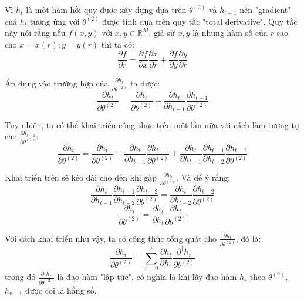 Vì $h_t$ là một hàm hồi quy được xây dựng dựa trên $\theta^{(2)}$ và $h_{t-1}$ nên "gradient" cuả $h_t$ tương ứng với $\theta^{(2)}$ được tính dựa trên quy tắc "total derivative". Quy tắc này nói rằng nếu $f(x,y)$ với $x, y \in \mathbb{R}^M$, giả sử $x,y$ là những hàm số của $r$ sao cho $x = x(r); y = y(r)$ thì ta có:
\begin{equation} \label{gradientWRTSt6}
	\frac{\partial{f}}{\partial{r}} = \frac{\partial f}{\partial x}\frac{\partial x }{\partial r} + \frac{\partial f }{\partial y }\frac{\partial y }{\partial r }
\end{equation}

Áp dụng vào trường hợp của $\frac{\partial h_t}{\partial \theta^{(2)} }$ ta được:
\begin{equation} \label{gradientWRTSt7}
	\frac{\partial h_t}{ \partial \theta^{(2)}} = \frac{\partial h_t}{ \partial \theta^{(2)}} + \frac{\partial h_t }{\partial h_{t-1} } \frac{\partial h_{t-1}}{ \partial \theta^{(2)}}
\end{equation}

Tuy nhiên, ta có thể khai triển công thức trên một lần nữa với cách làm tương tự cho $\frac{\partial h_{t-1}}{\partial \theta^{(2)} }$:
\begin{equation} \label{gradientWRTSt8}
	\frac{\partial h_t}{\partial \theta^{(2)}} = \frac{\partial h_t}{\partial \theta^{(2)}} + \frac{\partial h_t }{\partial h_{t-1}} \frac{\partial h_{t-1}}{\partial \theta^{(2)}} + \frac{\partial h_t}{\partial h_{t-1}} \frac{\partial h_{t-1}}{\partial h_{t-2}} \frac{\partial h_{t-2}}{\partial \theta^{(2)}}
\end{equation}

Khai triển trên sẽ kéo dài cho đến khi gặp $\frac{\partial h_0}{\partial \theta^{(2)}}$. Và để ý rằng:
\begin{equation} \label{gradientWRTSt9}
	\frac{\partial h_t}{\partial h_{t-1}} \frac{\partial h_{t-1}}{\partial h_{t-2}} \frac{\partial h_{t-2}}{\partial \theta^{(2)}} = \frac{\partial h_t}{\partial h_{t-2}}\frac{\partial h_{t-2}}{\partial \theta^{(2)}}
\end{equation}
\begin{equation} \label{gradientWRTSt10}
	\frac{\partial h_{t}}{\partial \theta^{(2)}} = \frac{\partial h_{t}}{\partial h_t} \frac{\partial h_t}{\partial \theta^{(2)}}
\end{equation}

Với cách khai triển như vậy, ta có công thức tổng quát cho $\frac{\partial h_t}{\partial \theta^{(2)}}$, đó là:
\begin{equation} \label{gradientWRTSt11}
	\frac{\partial h_t}{\partial \theta^{(2)}} = \sum_{r=0}^{t} \frac{\partial h_{t}}{\partial h_r} \frac{\partial^{\dagger} h_r}{\partial \theta^{(2)}}
\end{equation}
trong đó $\frac{\partial^{\dagger} h_r}{\partial \theta^{(2)}}$ là đạo hàm "lập tức", có nghĩa là khi lấy đạo hàm $h_r$ theo $\theta^{(2)}$, $h_{r-1}$ được coi là hằng số.

